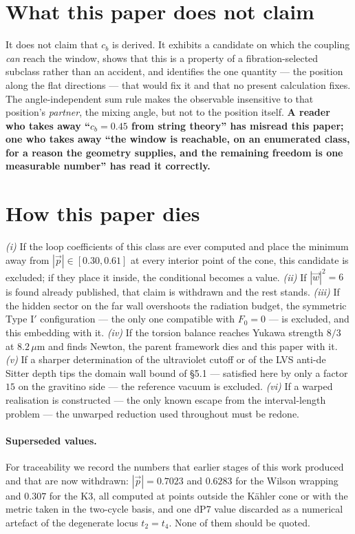 \section{What this paper does not claim}
It does not claim that $c_b$ is derived. It exhibits a candidate on which the coupling \emph{can} reach the window, shows that this is a property of a fibration-selected subclass rather than an accident, and identifies the one quantity --- the position along the flat directions --- that would fix it and that no present calculation fixes. The angle-independent sum rule makes the observable insensitive to that position's \emph{partner}, the mixing angle, but not to the position itself. \textbf{A reader who takes away ``$c_b=0.45$ from string theory'' has misread this paper; one who takes away ``the window is reachable, on an enumerated class, for a reason the geometry supplies, and the remaining freedom is one measurable number'' has read it correctly.}

\section{How this paper dies}
\emph{(i)} If the loop coefficients of this class are ever computed and place the minimum away from $|\vec p|\in[0.30,0.61]$ at every interior point of the cone, this candidate is excluded; if they place it inside, the conditional becomes a value. \emph{(ii)} If $|\vec w|^2=6$ is found already published, that claim is withdrawn and the rest stands. \emph{(iii)} If the hidden sector on the far wall overshoots the radiation budget, the symmetric Type I$'$ configuration --- the only one compatible with $F_0=0$ --- is excluded, and this embedding with it. \emph{(iv)} If the torsion balance reaches Yukawa strength $8/3$ at $8.2\,\mu$m and finds Newton, the parent framework dies and this paper with it. \emph{(v)} If a sharper determination of the ultraviolet cutoff or of the LVS anti-de Sitter depth tips the domain wall bound of \S5.1 --- satisfied here by only a factor $15$ on the gravitino side --- the reference vacuum is excluded. \emph{(vi)} If a warped realisation is constructed --- the only known escape from the interval-length problem --- the unwarped reduction used throughout must be redone.

\paragraph{Superseded values.} For traceability we record the numbers that earlier stages of this work produced and that are now withdrawn: $|\vec p|=0.7023$ and $0.6283$ for the Wilson wrapping and $0.307$ for the K3, all computed at points outside the K\"ahler cone or with the metric taken in the two-cycle basis, and one dP7 value discarded as a numerical artefact of the degenerate locus $t_2=t_4$. None of them should be quoted.

